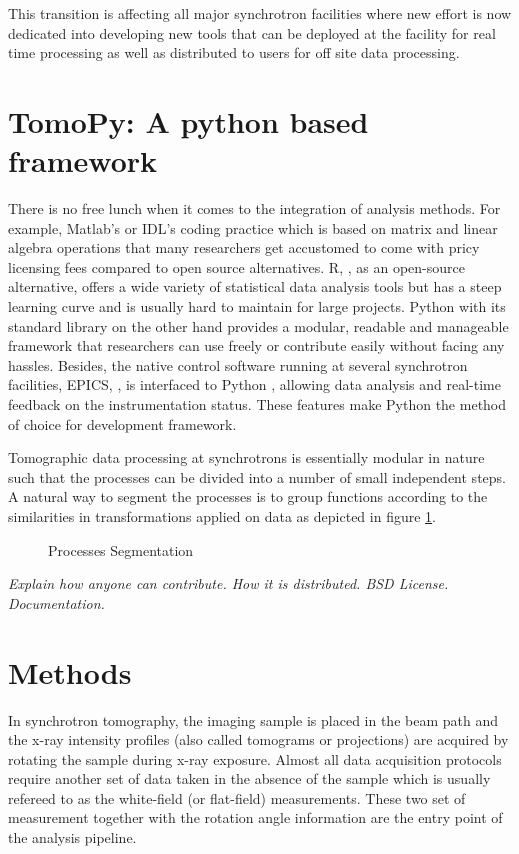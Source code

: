 \documentclass[pdf]{iucr}              %
\begin{document}
This transition is affecting all major synchrotron facilities where new effort is now dedicated into developing new tools that can be deployed at the facility for real time processing as well as distributed to users for off site data processing.


\section{TomoPy: A python based framework}

There is no free lunch when it comes to the integration of analysis methods. For example, Matlab's or IDL's coding practice which is based on matrix and linear algebra operations that many researchers get accustomed to come with pricy licensing fees compared to open source alternatives. R, \cite{r}, as an open-source alternative, offers a wide variety of statistical data analysis tools but has a steep learning curve and is usually hard to maintain for large projects. Python with its standard library on the other hand provides a modular, readable and manageable framework that researchers can use freely or contribute easily without facing any hassles. Besides, the native  control software running at several synchrotron facilities, EPICS, \cite{epics}, is interfaced to Python \cite{pyepics}, allowing data analysis and real-time feedback on the instrumentation status. These features make Python the method of choice for development framework.

Tomographic data processing at synchrotrons is essentially modular in nature such that the processes can be divided into a number of small independent steps. A natural way to segment the processes is to group functions according to the similarities in transformations applied on data as depicted in figure \ref{fig:ProcessSegmentation}. 


\begin{figure}
\centering
\caption{Processes Segmentation}
\label{fig:ProcessSegmentation}
\end{figure}

{\it Explain how anyone can contribute. How it is distributed. BSD License. Documentation.}

\section{Methods} 

In synchrotron tomography, the imaging sample is placed in the beam path and the x-ray intensity profiles (also called tomograms or projections) are acquired by rotating the sample during x-ray exposure. Almost all data acquisition protocols require another set of data taken in the absence of the sample which is usually refereed to as the white-field (or flat-field) measurements. These two set of measurement together with the rotation angle information are the entry point of the analysis pipeline.
\end{document}
